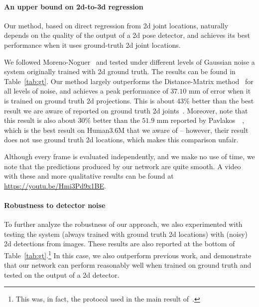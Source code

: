 \documentclass[10pt,twocolumn,letterpaper]{article}
\begin{document}
\paragraph{An upper bound on 2d-to-3d regression}
Our method, based on direct regression from 2d joint locations, naturally depends on the quality of the output of a 2d pose detector, and achieves its best performance when it uses ground-truth 2d joint locations.

We followed Moreno-Noguer~\cite{distance-matrix} and tested under different levels of Gaussian noise a system originally trained with 2d ground truth. The results can be found in Table~\ref{tab:gt}. Our method largely outperforms the Distance-Matrix method~\cite{distance-matrix} for all levels of noise, and achieves a peak performance of $37.10$ mm of error when it is trained on ground truth 2d projections. This is about 43\% better than the best result we are aware of reported on ground truth 2d joints~\cite{distance-matrix}.
Moreover, note that this result is also about 30\% better than the $51.9$ mm reported by Pavlakos~\etal~\cite{volumetric}, which is the best result on Human3.6M that we aware of -- however, their result does not use ground truth 2d locations, which makes this comparison unfair.

Although every frame is evaluated independently, and we make no use of time, we note that the predictions produced by our network are quite smooth.
A video with these and more qualitative results can be found at \url{https://youtu.be/Hmi3Pd9x1BE}.


\paragraph{Robustness to detector noise}

To further analyze the robustness of our approach, we also experimented with testing the system (always trained with  ground truth 2d locations) with (noisy) 2d detections from images.
These results are also reported at the bottom of Table~\ref{tab:gt}.\footnote{This was, in fact, the protocol used in the main result of~\cite{distance-matrix}.} In this case, we also outperform previous work, and demonstrate that our network can perform reasonably well when trained on ground truth and tested on the output of a 2d detector.
\end{document}
